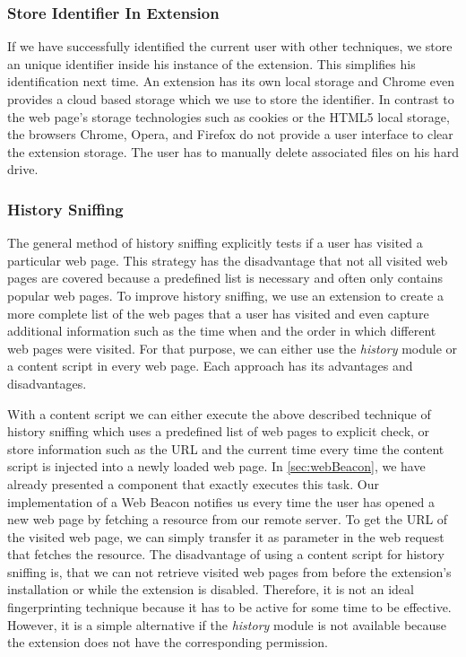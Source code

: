 \subsubsection{Store Identifier In Extension}
\label{sec:storeIdentifier}

	If we have successfully identified the current user with other techniques, we store an unique identifier inside his instance of the extension. This simplifies his identification next time. An extension has its own local storage and Chrome even provides a cloud based storage which we use to store the identifier. In contrast to the web page's storage technologies such as cookies or the HTML5 local storage, the browsers Chrome, Opera, and Firefox do not provide a user interface to clear the extension storage. The user has to manually delete associated files on his hard drive. 
	
\subsubsection{History Sniffing}
\label{sec:historySniffing}

	The general method of history sniffing explicitly tests if a user has visited a particular web page. This strategy has the disadvantage that not all visited web pages are covered because a predefined list is necessary and often only contains popular web pages. To improve history sniffing, we use an extension to create a more complete list of the web pages that a user has visited and even capture additional information such as the time when and the order in which different web pages were visited. For that purpose, we can either use the \textit{history} module or a content script in every web page. Each approach has its advantages and disadvantages. 
	
	With a content script we can either execute the above described technique of history sniffing which uses a predefined list of web pages to explicit check, or store information such as the URL and the current time every time the content script is injected into a newly loaded web page. In \autoref{sec:webBeacon}, we have already presented a component that exactly executes this task. Our implementation of a Web Beacon notifies us every time the user has opened a new web page by fetching a resource from our remote server. To get the URL of the visited web page, we can simply transfer it as parameter in the web request that fetches the resource. The disadvantage of using a content script for history sniffing is, that we can not retrieve visited web pages from before the extension's installation or while the extension is disabled. Therefore, it is not an ideal fingerprinting technique because it has to be active for some time to be effective. However, it is a simple alternative if the \textit{history} module is not available because the extension does not have the corresponding permission.
	
